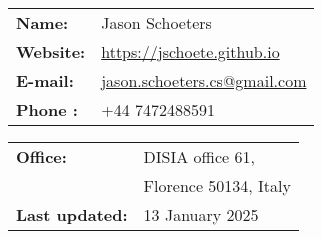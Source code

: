\documentclass[french]{resume} %
\begin{document}
	
	\begin{minipage}[t]{0.49\textwidth}
		\begin{tabular}{ m{7em} m{15em} }
			\textbf{Name:} & Jason Schoeters\\
			\textbf{Website:} & \url{https://jschoete.github.io}\\
			\textbf{E-mail: } & \href{mailto:jason.schoeters.cs@gmail.com}{jason.schoeters.cs@gmail.com}\\
			\textbf{Phone : } & +44 7472488591\\
		\end{tabular}
	\end{minipage} 
	\begin{minipage}[t]{0.49\textwidth}
		\begin{tabular}{ m{8em} m{20em} }
			\textbf{Office:} & DISIA office 61,\\
			&Florence 50134, \newline Italy\\
			\textbf{Last updated:} & 13 January 2025
		\end{tabular}
	\end{minipage} 
	
\end{document}
